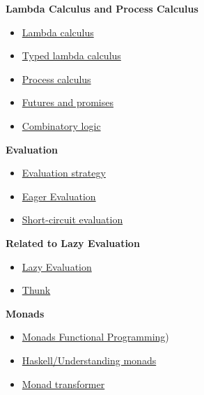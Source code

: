 \documentclass[11pt]{article}
\begin{document}
\textbf{Lambda Calculus and Process Calculus}

\begin{itemize}
\item \href{http://en.wikipedia.org/wiki/Lambda_calculus}{Lambda calculus}
\item \href{https://en.wikipedia.org/wiki/Typed_lambda_calculus}{Typed lambda calculus}
\item \href{https://en.wikipedia.org/wiki/Process_calculus}{Process calculus}
\end{itemize}


\begin{itemize}
\item \href{https://en.wikipedia.org/wiki/Futures_and_promises}{Futures and promises}
\item \href{https://en.wikipedia.org/wiki/Combinatory_logic}{Combinatory logic}
\end{itemize}


\textbf{Evaluation}

\begin{itemize}
\item \href{https://en.wikipedia.org/wiki/Evaluation_strategy}{Evaluation strategy}

\item \href{http://en.wikipedia.org/wiki/Eager_evaluation}{Eager Evaluation}
\item \href{http://en.wikipedia.org/wiki/Short-circuit_evaluation}{Short-circuit evaluation}
\end{itemize}

\textbf{Related to Lazy Evaluation}

\begin{itemize}
\item \href{http://en.wikipedia.org/wiki/Lazy_evaluation}{Lazy Evaluation}
\item \href{https://en.wikipedia.org/wiki/Thunk}{Thunk}
\end{itemize}

\textbf{Monads}

\begin{itemize}
\item \href{http://en.wikipedia.org/wiki/Monad_(functional_programming}{Monads Functional Programming})
\item \href{http://en.wikibooks.org/wiki/Haskell/Understanding_monads}{Haskell/Understanding monads}
\item \href{http://en.wikipedia.org/wiki/Monad_transformer}{Monad transformer}
\end{itemize}
\end{document}
